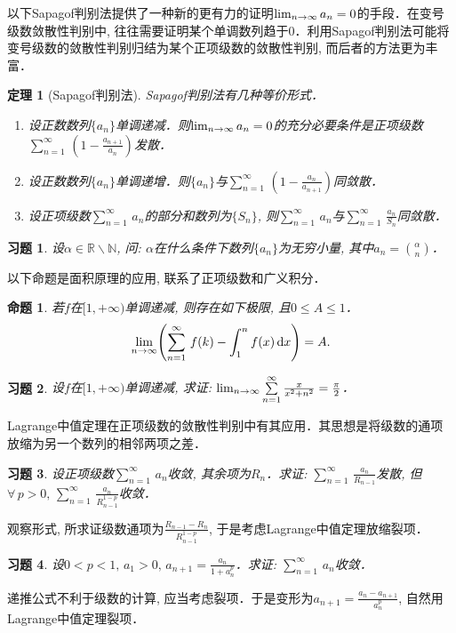 \documentclass[11pt,a4paper]{ctexart}
\makeatletter
\theoremstyle{thmseries} %
\newtheorem{thm}{定理}[section]
\newtheorem{prop}{命题}[section]
\theoremstyle{exerseries}
\newtheorem{exer}{习题}[section]
\renewenvironment{proof}[1][\proofname]{\par
  \pushQED{\qed}%
  \normalfont \topsep6\p@\@plus6\p@\relax
  \trivlist
  \item[\hskip\labelsep
        \itshape
    #1\@addpunct{}]\ignorespaces
}{%
  \popQED\endtrivlist\@endpefalse
}
\newenvironment{pf}{\begin{proof}[\bfseries\upshape 证\quad]}{\end{proof}}
\newcommand{\bra}[1]{\mathopen{}\left(#1\right)}
\newcommand{\R}{\mathbb{R}}
\newcommand{\N}{\mathbb{N}}
\renewcommand{\d}{\mathrm{d}}
\def \nti {\mathnormal{n}\to\infty}
\def \tseries {{\textstyle\sum\limits_{n=1}^{\infty}}\,} %
\def \dseries {\sum_{n=1}^{\infty}\,} %
\makeatother
\begin{document}
以下Sapagof判别法提供了一种新的更有力的证明$\lim_{\nti}a_n=0$的手段．在变号级数敛散性判别中, 往往需要证明某个单调数列趋于$0$．利用Sapagof判别法可能将变号级数的敛散性判别归结为某个正项级数的敛散性判别, 而后者的方法更为丰富．
\begin{thm}[Sapagof判别法]
	Sapagof判别法有几种等价形式．
	\begin{enumerate}
		\item 设正数数列$\{a_n\}$单调递减．则$\lim_{\nti}a_n=0$的充分必要条件是正项级数$\tseries\bra{1-\frac{a_{n+1}}{a_n}}$发散．
		\item 设正数数列$\{a_n\}$单调递增．则$\{a_n\}$与$\tseries\bra{1-\frac{a_n}{a_{n+1}}}$同敛散．
		\item 设正项级数$\tseries a_n$的部分和数列为$\{S_n\}$, 则$\tseries a_n$与$\tseries\frac{a_n}{S_n}$同敛散．
	\end{enumerate}
\end{thm}

\begin{exer}
	设$\alpha\in\R\backslash\N$, 问: $\alpha$在什么条件下数列$\{a_n\}$为无穷小量, 其中$a_n=\binom{\alpha}{n}$．
\end{exer}

以下命题是面积原理的应用, 联系了正项级数和广义积分．
\begin{prop}
	若$f$在$[1,+\infty)$单调递减, 则存在如下极限, 且$0\leq A\leq1$．
	\[\lim_{\nti}\bra{\dseries f(k)-\int_{1}^{n}f(x)\,\d x}=A.\]
\end{prop}

\begin{exer}
	设$f$在$[1,+\infty)$单调递减, 求证: $\lim_{\nti}\tseries\frac{x}{x^2+n^2}=\frac{\pi}{2}$．
\end{exer}

Lagrange中值定理在正项级数的敛散性判别中有其应用．其思想是将级数的通项放缩为另一个数列的相邻两项之差．
\begin{exer}
	设正项级数$\tseries a_n$收敛, 其余项为$R_n$．求证: $\tseries\frac{a_n}{R_{n-1}}$发散, 但$\forall\,p>0,\,\tseries\frac{a_n}{R_{n-1}^{1-p}}$收敛．
\end{exer}
\begin{pf}
	观察形式, 所求证级数通项为$\frac{R_{n-1}-R_n}{R_{n-1}^{1-p}}$, 于是考虑Lagrange中值定理放缩裂项．
\end{pf}

\begin{exer}
	设$0<p<1,\,a_1>0,\,a_{n+1}=\frac{a_n}{1+a_n^p}$．求证: $\tseries a_n$收敛．
\end{exer}
\begin{pf}
	递推公式不利于级数的计算, 应当考虑裂项．于是变形为$a_{n+1}=\frac{a_n-a_{n+1}}{a_n^p}$, 自然用Lagrange中值定理裂项．
\end{pf}
\end{document}
